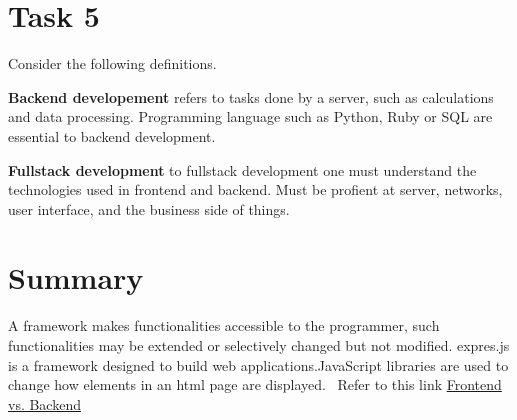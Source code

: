 \documentclass[12pt]{article}
\begin{document}
\section*{Task 5}
Consider the following definitions. 
\begin{todolist}
\item \textbf{Backend developement} refers to tasks done by a server, such as calculations and data processing. Programming language such as Python, Ruby or SQL are essential to backend development. 
 \item \textbf{Fullstack development} to fullstack development one must understand the technologies used in frontend and backend. Must be profient at server, networks, user interface, and the business side of things.  
\end{todolist}

\section*{Summary}
A framework makes functionalities accessible to the programmer, such functionalities may be extended or selectively changed but not modified. expres.js is a framework designed to build web applications.JavaScript libraries are used to change how elements in an html page are displayed. 
\ Refer to this link \color{red}\href{https://www.upwork.com/hiring/for-clients/frontend-vs-backend-web-development/}{Frontend vs. Backend}\color{black} 
\end{document}
